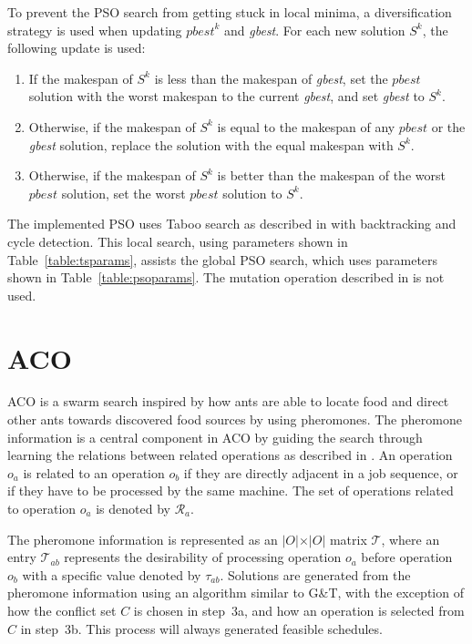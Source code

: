 \documentclass[paper=a4, fontsize=9pt]{scrartcl}
\begin{document}
\begin{multicols}{2}
To prevent the \ac{PSO} search from getting stuck in local minima, a diversification strategy is used when updating $\textit{pbest}^k$ and \textit{gbest}. For each new solution $S^k$, the following update is used:

\begin{enumerate}
    \item If the makespan of $S^k$ is less than the makespan of \textit{gbest}, set the $\textit{pbest}$ solution with the worst makespan to the current \textit{gbest}, and set \textit{gbest} to $S^k$.
    \item Otherwise, if the makespan of $S^k$ is equal to the makespan of any $\textit{pbest}$ or the \textit{gbest} solution, replace the solution with the equal makespan with $S^k$.
    \item Otherwise, if the makespan of $S^k$ is better than the makespan of the worst $\textit{pbest}$ solution, set the worst $\textit{pbest}$ solution to $S^k$.
\end{enumerate}

The implemented \ac{PSO} uses Taboo search as described in \cite{nowicki1996fast} with backtracking and cycle detection. This local search, using parameters shown in Table~\ref{table:tsparams}, assists the global \ac{PSO} search, which uses parameters shown in Table~\ref{table:psoparams}. The mutation operation described in \cite{sha2006hybrid} is not used.

\section*{\acl{ACO}}

\acf{ACO} is a swarm search inspired by how ants are able to locate food and direct other ants towards discovered food sources by using pheromones. The pheromone information is a central component in \ac{ACO} by guiding the search through learning the relations between related operations as described in \cite{blum2004ant}. An operation $o_a$ is related to an operation $o_b$ if they are directly adjacent in a job sequence, or if they have to be processed by the same machine. The set of operations related to operation $o_a$ is denoted by $\mathcal{R}_a$.

The pheromone information is represented as an $\vert O \vert \times \vert O \vert$ matrix $\mathcal{T}$, where an entry $\mathcal{T}_{ab}$ represents the desirability of processing operation $o_a$ before operation $o_b$ with a specific value denoted by $\tau_{ab}$. Solutions are generated from the pheromone information using an algorithm similar to G\&T, with the exception of how the conflict set $C$ is chosen in step~3a, and how an operation is selected from $C$ in step~3b. This process will always generated feasible schedules.


\end{multicols}
\end{document}
